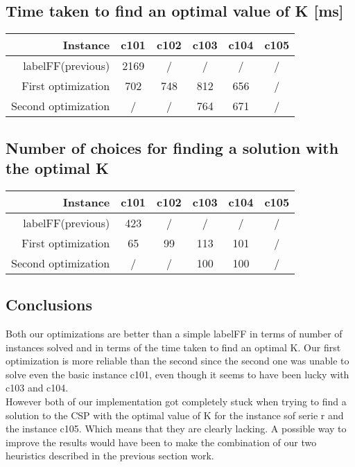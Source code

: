 \documentclass{eplDoc}
\begin{document}
\subsection{Time taken to find an optimal value of K [ms]}
\begin{tabular}{|r|c|c|c|c|c|}
	\hline
	Instance            & c101  & c102 & c103 & c104 & c105 \\   
	\hline
	labelFF(previous)  &  2169   &   / & /  &  / &   /  \\
	First optimization  &  702  &   748&  812 &   656&  /   \\
	Second optimization &   /   &   /  & 764  &  671 &  /   \\
	\hline
\end{tabular}
\subsection{Number of choices for finding a solution with the optimal K}
\begin{tabular}{|r|c|c|c|c|c|}
	\hline
	Instance            & c101  & c102 & c103 & c104 & c105 \\   
	\hline
	labelFF(previous)  &  423   &   / & /  &  / &   /  \\
	First optimization  &  65   &   99 & 113  &  101 &   /  \\
	Second optimization &   /   &   /  & 100  &  100 &   /  \\
	\hline
\end{tabular}

\subsection{Conclusions}
Both our optimizations are better than a simple labelFF in terms of number of instances solved and in terms of the time taken to find an optimal K. Our first optimization is more reliable than the second since the second one was unable to solve even the basic instance c101, even though it seems to have been lucky with c103 and c104.  \\ 
However both of our implementation got completely stuck when trying to find a solution to the CSP with the optimal value of K for the instance sof serie r and the instance c105. Which means that they are clearly lacking. A possible way to improve the results would have been to make the combination of our two heuristics described in the previous section work. 
\end{document}
